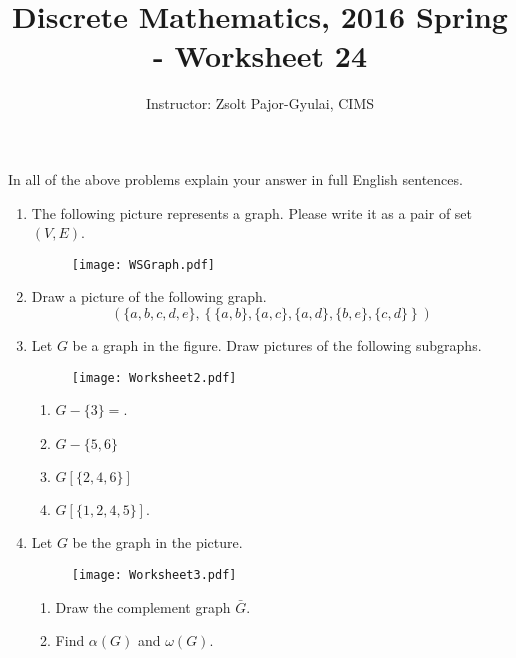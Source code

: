 \documentclass[11pt]{preprint}
\title{Discrete Mathematics, 2016 Spring - Worksheet 24}
\author{Instructor: Zsolt Pajor-Gyulai, CIMS}
\def\enumb{\begin{enumerate}}
\def\enume{\end{enumerate}}
\begin{document}
\maketitle

In all of the above problems explain your answer in full English sentences.

\enumb
\item The following picture represents a graph. Please write it as a pair of set $(V,E)$.
\begin{figure}[ht]
\centering
\texttt{[image: WSGraph.pdf]}
\end{figure}\vspace{-0.6cm}

\item Draw a picture of the following graph.
\[
\left(\{a,b,c,d,e\},\left\{\{a,b\},\{a,c\},\{a,d\},\{b,e\},\{c,d\}\right\}\right)
\]

\item Let $G$ be a graph in the figure. Draw pictures of the following subgraphs.

\begin{figure}[ht]
\centering
\texttt{[image: Worksheet2.pdf]}
\end{figure}\vspace{-0.9cm}
\enumb
\item $G-\{3\}=$.
\item $G-\{5,6\}$
\item $G[\{2,4,6\}]$
\item $G[\{1,2,4,5\}]$.
\enume
\item Let $G$ be the graph in the picture.
\begin{figure}[ht]
\centering
\texttt{[image: Worksheet3.pdf]}
\end{figure}
\enumb
\item Draw the complement graph $\bar{G}$.
\item Find $\alpha(G)$ and $\omega(G)$.
\enume
\enume
\end{document}

